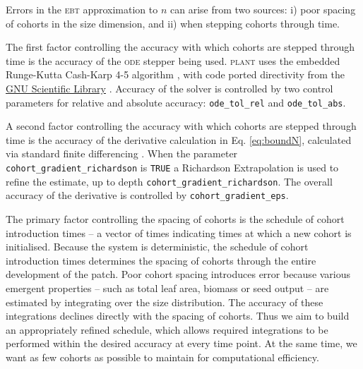 \documentclass[10pt,twoside]{article}
\newcommand{\plant}{\textsc{plant}}
\begin{document}
Errors in the \textsc{ebt} approximation to \(n\) can arise from two sources: i)
poor spacing of cohorts in the size dimension, and ii) when stepping
cohorts through time.

The first factor controlling the accuracy with which cohorts are stepped
through time is the accuracy of the \textsc{ode} stepper being used. {\plant} uses
the embedded Runge-Kutta Cash-Karp 4-5 algorithm \citep{Cash-1990}, with
code ported directivity from the
\href{http://www.gnu.org/software/gsl/}{GNU Scientific Library}
\citep{Galassi-2009}. Accuracy of the solver is controlled by two
control parameters for relative and absolute accuracy:
\texttt{ode\_tol\_rel} and \texttt{ode\_tol\_abs}.

A second factor controlling the accuracy with which cohorts are stepped
through time is the accuracy of the derivative calculation in Eq.
\ref{eq:boundN}, calculated via standard finite differencing
\citep{Abramowitz-2012}. When the parameter
\texttt{cohort\_gradient\_richardson} is \texttt{TRUE} a Richardson Extrapolation
\citep{Stoer-2002} is used to refine the estimate, up to depth
\texttt{cohort\_gradient\_richardson}. The overall accuracy of the
derivative is controlled by \texttt{cohort\_gradient\_eps}.

The primary factor controlling the spacing of cohorts is the schedule of
cohort introduction times -- a vector of times indicating times at which
a new cohort is initialised. Because the system is deterministic, the
schedule of cohort introduction times determines the spacing of cohorts
through the entire development of the patch. Poor cohort spacing
introduces error because various emergent properties -- such as total
leaf area, biomass or seed output -- are estimated by integrating over
the size distribution. The accuracy of these integrations declines
directly with the spacing of cohorts. Thus we aim to build an
appropriately refined schedule, which allows required integrations to be
performed within the desired accuracy at every time point. At the same
time, we want as few cohorts as possible to maintain for computational
efficiency.
\end{document}
